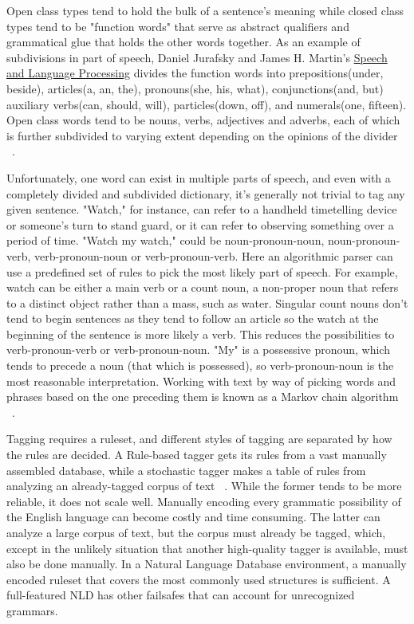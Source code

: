 \documentclass[12pt]{article}
\begin{document}
Open class types tend to hold the bulk of a sentence's meaning while closed class types tend to be "function words" that serve as abstract qualifiers and grammatical glue that holds the other words together. As an example of subdivisions in part of speech, Daniel Jurafsky and James H. Martin's \underline{Speech and Language Processing} divides the function words into prepositions(under, beside), articles(a, an, the), pronouns(she, his, what), conjunctions(and, but) auxiliary verbs(can, should, will), particles(down, off), and numerals(one, fifteen). Open class words tend to be nouns, verbs, adjectives and adverbs, each of which is further subdivided to varying extent depending on the opinions of the divider ~\citep{Jurafsky}.

Unfortunately, one word can exist in multiple parts of speech, and even with a completely divided and subdivided dictionary, it's generally not trivial to tag any given sentence. "Watch," for instance, can refer to a handheld timetelling device or someone's turn to stand guard, or it can refer to observing something over a period of time. "Watch my watch," could be noun-pronoun-noun, noun-pronoun-verb, verb-pronoun-noun or verb-pronoun-verb. Here an algorithmic parser can use a predefined set of rules to pick the most likely part of speech. For example, watch can be either a main verb or a count noun, a non-proper noun that refers to a distinct object rather than a mass, such as water. Singular count nouns don't tend to begin sentences as they tend to follow an article so the watch at the beginning of the sentence is more likely a verb. This reduces the possibilities to verb-pronoun-verb or verb-pronoun-noun. "My" is a possessive pronoun, which tends to precede a noun (that which is possessed), so verb-pronoun-noun is the most reasonable interpretation.  Working with text by way of picking words and phrases based on the one preceding them is known as a Markov chain algorithm ~\citep{Markov}.

Tagging requires a ruleset, and different styles of tagging are separated by how the rules are decided. A Rule-based tagger gets its rules from a vast manually assembled database, while a stochastic tagger makes a table of rules from analyzing an already-tagged corpus of text ~\citep{Jurafsky}. While the former tends to be more reliable, it does not scale well. Manually encoding every grammatic possibility of the English language can become costly and time consuming. The latter can analyze a large corpus of text, but the corpus must already be tagged, which, except in the unlikely situation that another high-quality tagger is available, must also be done manually. In a Natural Language Database environment, a manually encoded ruleset that covers the most commonly used structures is sufficient. A full-featured NLD has other failsafes that can account for unrecognized grammars. 
\end{document}
